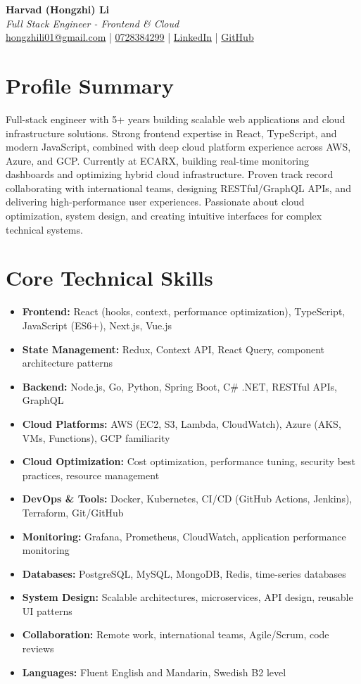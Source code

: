 \documentclass[11pt,a4paper]{article}
\begin{document}
\pagestyle{empty}

\begin{center}
{\LARGE \textbf{Harvad (Hongzhi) Li}}\\[10pt]
{\Large \textit{Full Stack Engineer - Frontend \& Cloud}}\\[10pt]
\textcolor{linkedinblue}{\href{mailto:hongzhili01@gmail.com}{hongzhili01@gmail.com} | \href{tel:0728384299}{0728384299} | \href{https://www.linkedin.com/in/harvad/}{LinkedIn} | \href{https://github.com/bluehawana}{GitHub}}
\end{center}

\section*{Profile Summary}
Full-stack engineer with 5+ years building scalable web applications and cloud infrastructure solutions. Strong frontend expertise in React, TypeScript, and modern JavaScript, combined with deep cloud platform experience across AWS, Azure, and GCP. Currently at ECARX, building real-time monitoring dashboards and optimizing hybrid cloud infrastructure. Proven track record collaborating with international teams, designing RESTful/GraphQL APIs, and delivering high-performance user experiences. Passionate about cloud optimization, system design, and creating intuitive interfaces for complex technical systems.

\section*{Core Technical Skills}
\begin{itemize}[noitemsep]
\item \textbf{Frontend:} React (hooks, context, performance optimization), TypeScript, JavaScript (ES6+), Next.js, Vue.js
\item \textbf{State Management:} Redux, Context API, React Query, component architecture patterns
\item \textbf{Backend:} Node.js, Go, Python, Spring Boot, C\# .NET, RESTful APIs, GraphQL
\item \textbf{Cloud Platforms:} AWS (EC2, S3, Lambda, CloudWatch), Azure (AKS, VMs, Functions), GCP familiarity
\item \textbf{Cloud Optimization:} Cost optimization, performance tuning, security best practices, resource management
\item \textbf{DevOps \& Tools:} Docker, Kubernetes, CI/CD (GitHub Actions, Jenkins), Terraform, Git/GitHub
\item \textbf{Monitoring:} Grafana, Prometheus, CloudWatch, application performance monitoring
\item \textbf{Databases:} PostgreSQL, MySQL, MongoDB, Redis, time-series databases
\item \textbf{System Design:} Scalable architectures, microservices, API design, reusable UI patterns
\item \textbf{Collaboration:} Remote work, international teams, Agile/Scrum, code reviews
\item \textbf{Languages:} Fluent English and Mandarin, Swedish B2 level
\end{itemize}
\end{document}
